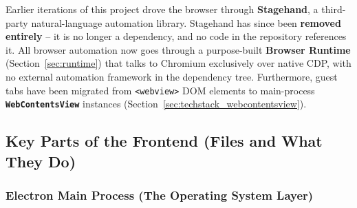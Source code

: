 \documentclass[11pt,a4paper]{article}
\begin{document}
\begin{tcolorbox}[colback=red!6!white,colframe=red!55!black,title=Design change since v2.0]
Earlier iterations of this project drove the browser through \textbf{Stagehand}, a third-party natural-language automation library. Stagehand has since been \textbf{removed entirely} -- it is no longer a dependency, and no code in the repository references it. All browser automation now goes through a purpose-built \textbf{Browser Runtime} (Section~\ref{sec:runtime}) that talks to Chromium exclusively over native CDP, with no external automation framework in the dependency tree. Furthermore, guest tabs have been migrated from \texttt{<webview>} DOM elements to main-process \textbf{\texttt{WebContentsView}} instances (Section~\ref{sec:techstack_webcontentsview}).
\end{tcolorbox}

\subsection{Key Parts of the Frontend (Files and What They Do)}

\subsubsection*{Electron Main Process (The Operating System Layer)}
\end{document}
